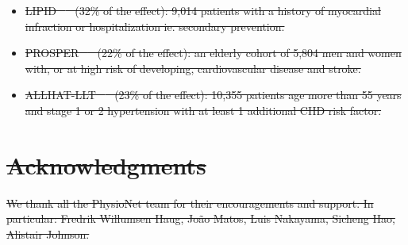 \documentclass[10pt,letterpaper]{article}
\providecommand{\DIFdeltex}[1]{{\protect\color{red}\sout{#1}}}                      %
\providecommand{\DIFdelbegin}{} %
\providecommand{\DIFdelend}{} %
\providecommand{\DIFdel}[1]{\texorpdfstring{\DIFdeltex{#1}}{}} %
\newcommand{\DIFscaledelfig}{0.5}
\newlength{\DIFdelgraphicswidth} %
\newlength{\DIFdelgraphicsheight} %
\newcommand{\DIFdelincludegraphics}[2][]{%
\sbox{\DIFdelgraphicsbox}{\DIFOincludegraphics[#1]{#2}}%
\settoboxwidth{\DIFdelgraphicswidth}{\DIFdelgraphicsbox} %
\settoboxtotalheight{\DIFdelgraphicsheight}{\DIFdelgraphicsbox} %
\scalebox{\DIFscaledelfig}{%
\parbox[b]{\DIFdelgraphicswidth}{\usebox{\DIFdelgraphicsbox}\\[-\baselineskip] \rule{\DIFdelgraphicswidth}{0em}}\llap{\resizebox{\DIFdelgraphicswidth}{\DIFdelgraphicsheight}{%
\setlength{\unitlength}{\DIFdelgraphicswidth}%
\begin{picture}(1,1)%
\thicklines\linethickness{2pt} %
{\color[rgb]{1,0,0}\put(0,0){\framebox(1,1){}}}%
{\color[rgb]{1,0,0}\put(0,0){\line( 1,1){1}}}%
{\color[rgb]{1,0,0}\put(0,1){\line(1,-1){1}}}%
\end{picture}%
}\hspace*{3pt}}} %
} %
\DeclareRobustCommand{\DIFdelbegin}{\DIFOdelbegin \let\includegraphics\DIFdelincludegraphics} %
\DeclareRobustCommand{\DIFdelend}{\DIFOaddend \let\includegraphics\DIFOincludegraphics} %
\begin{document}
\DIFdelbegin %
\begin{itemize}%
\item%
\DIFdel{LIPID \mbox{%
\cite{long1998prevention} }\hskip0pt%
(32\% of the effect): 9,014 patients with a history of
        myocardial infraction or hospitalization ie. secondary prevention.
  }%
\item%
\DIFdel{PROSPER \mbox{%
\cite{shepherd2002pravastatin} }\hskip0pt%
(22\% of the effect): an elderly cohort of
        5,804 men and women with, or at high risk of developing, cardiovascular
        disease and stroke.
  }%
\item%
\DIFdel{ALLHAT-LLT \mbox{%
\cite{antihypertensive2002major} }\hskip0pt%
(23\% of the effect): 10,355 patients age more than 55
        years and stage 1 or 2 hypertension with at least 1 additional CHD risk
        factor.
}
\end{itemize}%
\DIFdelend %

\DIFdelbegin \section*{\DIFdel{Acknowledgments}}
\DIFdelend %

\DIFdelbegin \DIFdel{We thank all the PhysioNet team for their encouragements and support. In
particular: Fredrik Willumsen Haug, João Matos, Luis Nakayama, Sicheng Hao, Alistair Johnson.
}\DIFdelend %
\end{document}
